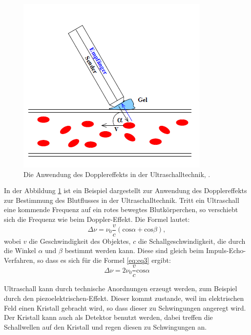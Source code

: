 \begin{figure}[h!]
	\centering
	\includegraphics[width=0.5\linewidth]{Ultraschall.png}
	\caption{Die Anwendung des Dopplereffekts in der Ultraschalltechnik, \cite[1]{anleitungUS3}.}
	\label{fig:ultraschall}
\end{figure}
In der Abbildung \ref{fig:ultraschall} ist ein Beispiel dargestellt zur Anwendung des Dopplereffekts zur Bestimmung des Blutflusses in der Ultraschalltechnik. 
Tritt ein Ultraschall eine kommende Frequenz auf ein rotes bewegtes Blutkörperchen, so verschiebt sich die Frequenz wie beim Doppler-Effekt.
Die Formel lautet:
\begin{equation}
\label{eq:eq3}
\Delta \nu = \nu_0 \frac{v}{c}(\text{cos}\alpha + \text{cos}\beta),
\end{equation}
wobei $v$ die Geschwindigkeit des Objektes, $c$ die Schallgeschwindigkeit, die durch die Winkel $\alpha$ und $\beta$ bestimmt werden kann. 
Diese sind gleich beim Impuls-Echo-Verfahren, so dass es sich für die Formel \ref{eq:eq3} ergibt:
\begin{equation}
\label{eq:eq4}
\Delta \nu = 2 \nu_0 \frac{v}{c} \text{cos}\alpha
\end{equation}

Ultraschall kann durch technische Anordnungen erzeugt werden, zum Beispiel durch den piezoelektrischen-Effekt. Dieser kommt zustande, weil im elektrischen Feld einen Kristall gebracht wird, so dass dieser zu Schwingungen angeregt wird. 
Der Kristall kann auch als Detektor benutzt werden, dabei treffen die Schallwellen auf den Kristall und regen diesen zu Schwingungen an.